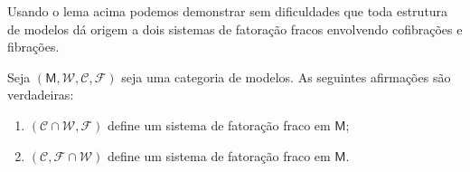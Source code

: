 Usando o lema acima podemos demonstrar sem dificuldades que toda estrutura de modelos dá origem a dois sistemas de fatoração fracos envolvendo cofibrações e fibrações.

\begin{prop}\label{prop:fatoracoes_fracas_via_estrutura_de_modelos}
  Seja $(\mathsf{M},\mathcal{W},\mathcal{C},\mathcal{F})$ seja uma categoria de modelos.
  As seguintes afirmações são verdadeiras:
  \begin{enumerate}
  \item $(\mathcal{C} \cap \mathcal{W},\mathcal{F})$ define um sistema de fatoração fraco em $\mathsf{M}$;
    
  \item $(\mathcal{C},\mathcal{F} \cap \mathcal{W})$ define um sistema de fatoração fraco em $\mathsf{M}$.
  \end{enumerate}
\end{prop}

